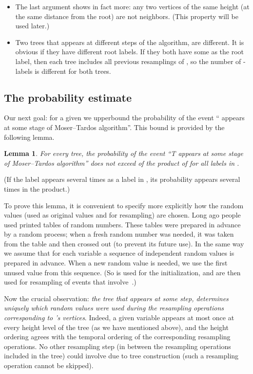 \documentclass[12pt]{article}
\newtheorem{lemma}{Lemma}
\begin{document}
\begin{itemize}
\item The last argument shows in fact more: any two vertices of the same height (at the same distance from the root) are not neighbors. (This property will be used later.)

\item Two trees that appears at different steps of the algorithm, are different. It is obvious if they have different root labels. If they both have some  as the root label, then each tree includes all previous resamplings of , so the number of -labels is different for both trees.

\end{itemize}

\subsection{The probability estimate}

Our next goal: for a given  we upperbound the probability of the event `` appears at some stage of Moser--Tardos algorithm''. This bound is provided by the following lemma.

\begin{lemma}\label{treeprob}
For every tree, the probability of the event ``T appears at some stage of Moser--Tardos algorithm'' does not exceed of the product of  for all labels in .
\end{lemma}

\noindent
(If the label  appears several times as a label in , its probability appears several times in the product.)

To prove this lemma, it is convenient to specify more explicitly how the random values (used as original values and for resampling) are chosen. Long ago people used printed tables of random numbers. These tables were prepared in advance by a random process; when a fresh random number was needed, it was taken from the table and then crossed out (to prevent its future use). In the same way we assume that for each variable  a sequence of independent random values  is prepared in advance. When a new random value is needed, we use the first unused value from this sequence. (So  is used for the initialization, and  are then used for resampling of events that involve~.)

Now the crucial observation: \emph{the tree  that appears at some step, determines uniquely which random values were used during the resampling operations
corresponding to 's vertices}. Indeed, a given variable  appears at most once at every height level of the tree (as we have mentioned above), and the height ordering agrees with the temporal ordering of the corresponding resampling operations. No other resampling step (in between the resampling operations included in the tree) could involve  due to tree construction (such a resampling operation cannot be skipped).
\end{document}
